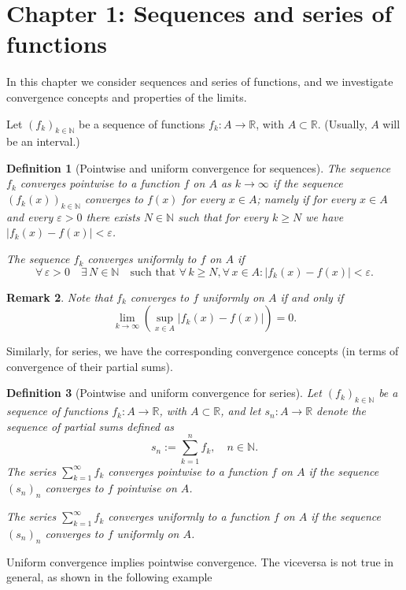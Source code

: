 \documentclass[a4paper,reqno]{amsart}
\numberwithin{equation}{section}
\newtheorem{definition}{Definition}[section]
\newtheorem{remark}[definition]{Remark}
\def\N{\mathbb{N}}
\def\R{\mathbb{R}}
\begin{document}
\section{Chapter 1: Sequences and series of functions}
In this chapter we consider sequences and series of functions, and we investigate convergence concepts and properties of the limits.
\medskip

\noindent
Let $(f_k)_{k\in \mathbb{N}}$ be a sequence of functions $f_k:A \to \R$, with $A\subset \R$. (Usually, $A$ will be an interval.)

\begin{definition}[Pointwise and uniform convergence for sequences] The sequence $f_k$ converges pointwise to a function $f$ on $A$ as $k\to \infty$ if the sequence $(f_k(x))_{k\in \N}$ converges to $f(x)$ for every $x\in A$; namely if for every $x\in A$ and every $\varepsilon>0$ there exists $N\in \mathbb{N}$ such that for every $k\geq N$ we have $|f_k (x) - f (x)| < \varepsilon$.

\medskip

The sequence $f_k$ converges uniformly to $f$ on $A$ if
$$
\forall \,\varepsilon>0 \quad \exists\, N\in \mathbb{N} \quad \textrm{such that } \forall \,k\geq N, \forall\, x\in A: |f_k (x) - f (x)| < \varepsilon.
$$
\end{definition}


\begin{remark}
Note that $f_k$ converges to $f$ uniformly on $A$ if and only if 
$$
\lim_{k\to \infty} \left(\sup_{x\in A} |f_k(x)-f(x)|\right)=0.
$$
\end{remark}

Similarly, for series, we have the corresponding convergence concepts (in terms of convergence of their partial sums). 

\begin{definition}[Pointwise and uniform convergence for series] Let $(f_k)_{k\in \mathbb{N}}$ be a sequence of functions $f_k:A \to \R$, with $A\subset \R$, and let $s_n:A\to \R$ denote the sequence of partial sums defined as 
$$
s_n:= \sum_{k=1}^n f_k, \quad n\in \N.
$$
The series $\sum_{k=1}^\infty f_k$ converges pointwise to a function $f$ on $A$ if the sequence $(s_n)_n$ converges to $f$ pointwise on $A$.

The series $\sum_{k=1}^\infty f_k$ converges uniformly to a function $f$ on $A$ if the sequence $(s_n)_n$ converges to $f$ uniformly on $A$.
\end{definition}

Uniform convergence implies pointwise convergence. The viceversa is not true in general, as shown in the following example
\end{document}
